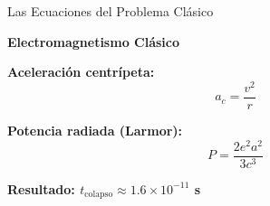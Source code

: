 \documentclass[12pt,aspectratio=169]{beamer}
\begin{document}
\begin{frame}{Las Ecuaciones del Problema Clásico}
    \vspace{0.5cm}
    \begin{center}
        \huge \textbf{Electromagnetismo Clásico}
    \end{center}
    
    \vspace{1cm}
    \begin{center}
        \colorbox{rojoclaro!10}{\parbox{0.9\textwidth}{
            \begin{center}
                \Large \textbf{Aceleración centrípeta:}
                \Huge $$a_c = \frac{v^2}{r}$$
            \end{center}
        }}
    \end{center}
    
    \vspace{1cm}
    \begin{center}
        \colorbox{rojoclaro!10}{\parbox{0.9\textwidth}{
            \begin{center}
                \Large \textbf{Potencia radiada (Larmor):}
                \Huge $$P = \frac{2e^2a^2}{3c^3}$$
            \end{center}
        }}
    \end{center}
    
    \vspace{1cm}
    \begin{center}
        \LARGE \textcolor{rojoclaro}{\textbf{Resultado: $t_{\text{colapso}} \approx 1.6 \times 10^{-11}$ s}}
    \end{center}
\end{frame}
\end{document}
